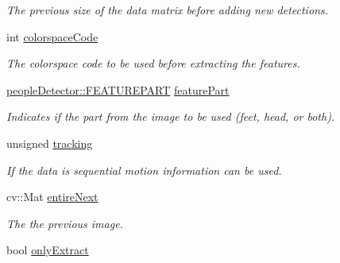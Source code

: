 \begin{DoxyCompactItemize}
\begin{DoxyCompactList}\small\item\em The previous size of the data matrix before adding new detections. \item\end{DoxyCompactList}\item 
\hypertarget{classpeopleDetector_a7c276994d9dba181d334351f418631a7}{
int \hyperlink{classpeopleDetector_a7c276994d9dba181d334351f418631a7}{colorspaceCode}}
\label{classpeopleDetector_a7c276994d9dba181d334351f418631a7}

\begin{DoxyCompactList}\small\item\em The colorspace code to be used before extracting the features. \item\end{DoxyCompactList}\item 
\hypertarget{classpeopleDetector_a4c2250cf8f4852e5e763ea7519db0e86}{
\hyperlink{classpeopleDetector_a6ac98abe8ed7600f0db3fb04d718c27c}{peopleDetector::FEATUREPART} \hyperlink{classpeopleDetector_a4c2250cf8f4852e5e763ea7519db0e86}{featurePart}}
\label{classpeopleDetector_a4c2250cf8f4852e5e763ea7519db0e86}

\begin{DoxyCompactList}\small\item\em Indicates if the part from the image to be used (feet, head, or both). \item\end{DoxyCompactList}\item 
\hypertarget{classpeopleDetector_ab69e69fa9a572b68323c36423e885025}{
unsigned \hyperlink{classpeopleDetector_ab69e69fa9a572b68323c36423e885025}{tracking}}
\label{classpeopleDetector_ab69e69fa9a572b68323c36423e885025}

\begin{DoxyCompactList}\small\item\em If the data is sequential motion information can be used. \item\end{DoxyCompactList}\item 
\hypertarget{classpeopleDetector_ab01b95252b8490c09222b0f11baffbb7}{
cv::Mat \hyperlink{classpeopleDetector_ab01b95252b8490c09222b0f11baffbb7}{entireNext}}
\label{classpeopleDetector_ab01b95252b8490c09222b0f11baffbb7}

\begin{DoxyCompactList}\small\item\em The the previous image. \item\end{DoxyCompactList}\item 
\hypertarget{classpeopleDetector_aa21340a84bcfe8b3f13304d2eac7a5c5}{
bool \hyperlink{classpeopleDetector_aa21340a84bcfe8b3f13304d2eac7a5c5}{onlyExtract}}
\label{classpeopleDetector_aa21340a84bcfe8b3f13304d2eac7a5c5}


\end{DoxyCompactItemize}
